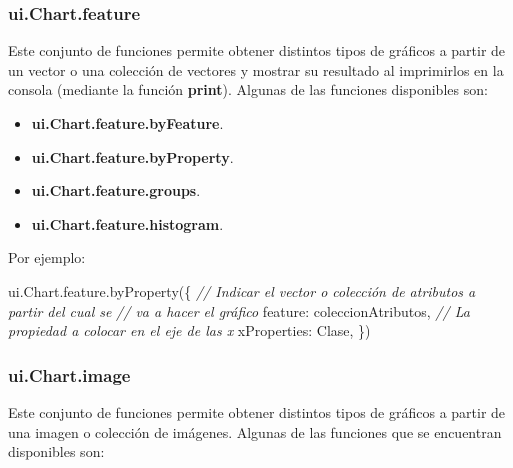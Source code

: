 \documentclass[
  12pt,
  letterpaper,
  twoside]{book}
\newenvironment{Shaded}{\begin{snugshade}}{\end{snugshade}}
\newcommand{\AttributeTok}[1]{\textcolor[rgb]{0.48,0.12,0.64}{#1}}
\newcommand{\CommentTok}[1]{\textcolor[rgb]{0.24,0.58,0.00}{\textit{#1}}}
\newcommand{\DataTypeTok}[1]{\textcolor[rgb]{0.00,0.00,0.00}{#1}}
\newcommand{\FunctionTok}[1]{\textcolor[rgb]{0.48,0.12,0.64}{#1}}
\newcommand{\NormalTok}[1]{#1}
\newcommand{\OperatorTok}[1]{\textcolor[rgb]{0.00,0.00,0.00}{#1}}
\newcommand{\StringTok}[1]{\textcolor[rgb]{0.87,0.29,0.22}{#1}}
\providecommand{\tightlist}{%
  \setlength{\itemsep}{0pt}\setlength{\parskip}{0pt}}
\newcommand\boldpurple[1]{\textcolor{darkpurple}{\textbf{#1}}}
\begin{document}
\hypertarget{ui.chart.feature}{%
\subsubsection*{ui.Chart.feature}\label{ui.chart.feature}}

Este conjunto de funciones permite obtener distintos tipos de gráficos a partir de un vector o una colección de vectores y mostrar su resultado al imprimirlos en la consola (mediante la función \boldpurple{print}). Algunas de las funciones disponibles son:

\begin{itemize}
\tightlist
\item
  \boldpurple{ui.Chart.feature.byFeature}.
\item
  \boldpurple{ui.Chart.feature.byProperty}.
\item
  \boldpurple{ui.Chart.feature.groups}.
\item
  \boldpurple{ui.Chart.feature.histogram}.
\end{itemize}

Por ejemplo:

\begin{Shaded}
\begin{Highlighting}[]
\NormalTok{ui}\OperatorTok{.}\AttributeTok{Chart}\OperatorTok{.}\AttributeTok{feature}\OperatorTok{.}\FunctionTok{byProperty}\NormalTok{(\{}
  \CommentTok{// Indicar el vector o colección de atributos a partir del cual se }
  \CommentTok{// va a hacer el gráfico}
  \DataTypeTok{feature}\OperatorTok{:}\NormalTok{ coleccionAtributos}\OperatorTok{,} 
  \CommentTok{// La propiedad a colocar en el eje de las x}
  \DataTypeTok{xProperties}\OperatorTok{:} \StringTok{\textquotesingle{}Clase\textquotesingle{}}\OperatorTok{,}
\NormalTok{\})}
\end{Highlighting}
\end{Shaded}

\hypertarget{ui.chart.image}{%
\subsubsection*{ui.Chart.image}\label{ui.chart.image}}

Este conjunto de funciones permite obtener distintos tipos de gráficos a partir de una imagen o colección de imágenes. Algunas de las funciones que se encuentran disponibles son:
\end{document}

